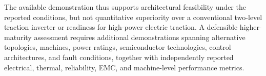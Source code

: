 The available demonstration thus supports architectural feasibility under the reported conditions, but not quantitative superiority over a conventional two-level traction inverter or readiness for high-power electric traction. A defensible higher-maturity assessment requires additional demonstrations spanning alternative topologies, machines, power ratings, semiconductor technologies, control architectures, and fault conditions, together with independently reported electrical, thermal, reliability, EMC, and machine-level performance metrics. %